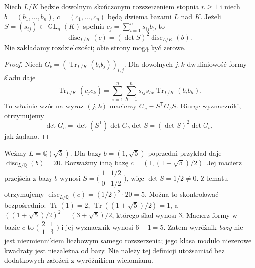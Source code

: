 \begin{lemat}\label{aa:lem:trace-discriminant-base-change}
Niech $L/K$ będzie dowolnym skończonym rozszerzeniem
stopnia $n\ge1$ i niech $b=(b_1,\ldots,b_n)$,
$c=(c_1,\ldots,c_n)$ będą dwiema bazami $L$ nad $K$.
Jeżeli $S=(s_{ij})\in\operatorname{GL}_n(K)$
spełnia $c_j=\sum_{i=1}^n s_{ij}b_i$, to
\[
\operatorname{disc}_{L/K}(c)=(\det S)^2
\operatorname{disc}_{L/K}(b).
\]
Nie zakładamy rozdzielczości; obie strony mogą być zerowe.
\end{lemat}
\begin{proof}
Niech $G_b=(\operatorname{Tr}_{L/K}(b_ib_j))_{i,j}$.
Dla dowolnych $j,k$ dwuliniowość formy śladu daje
\[
\operatorname{Tr}_{L/K}(c_jc_k)
=\sum_{i=1}^n\sum_{h=1}^n
s_{ij}s_{hk}\operatorname{Tr}_{L/K}(b_ib_h).
\]
To właśnie wzór na wyraz $(j,k)$ macierzy
$G_c=S^{\mathsf T}G_bS$. Biorąc wyznaczniki,
otrzymujemy
\[
\det G_c=\det(S^{\mathsf T})\det G_b\det S
=(\det S)^2\det G_b,
\]
jak żądano.
\end{proof}
\begin{przyklad}
\label{aa:prz:trace-discriminant-other-basis}
Weźmy $L=\mathbb Q(\sqrt5)$. Dla bazy
$b=(1,\sqrt5)$ poprzedni przykład daje $\operatorname{disc}_{L/\mathbb Q}(b)=20$.
Rozważmy inną bazę $c=(1,(1+\sqrt5)/2)$.
Jej macierz przejścia z bazy $b$ wynosi
$S=\bigl(\begin{smallmatrix}1&1/2\\0&1/2\end{smallmatrix}\bigr)$,
więc $\det S=1/2\ne0$. Z lematu otrzymujemy
$\operatorname{disc}_{L/\mathbb Q}(c)=(1/2)^2\cdot20=5$.
Można to skontrolować bezpośrednio:
$\operatorname{Tr}(1)=2$,
$\operatorname{Tr}((1+\sqrt5)/2)=1$, a
$((1+\sqrt5)/2)^2=(3+\sqrt5)/2$, którego ślad wynosi $3$.
Macierz formy w bazie $c$ to
$\bigl(\begin{smallmatrix}2&1\\1&3\end{smallmatrix}\bigr)$
i jej wyznacznik wynosi $6-1=5$.
Zatem wyróżnik \emph{bazy} nie jest niezmiennikiem liczbowym
samego rozszerzenia; jego klasa modulo niezerowe kwadraty
jest niezależna od bazy. Nie należy tej definicji utożsamiać
bez dodatkowych założeń z wyróżnikiem wielomianu.
\end{przyklad}


